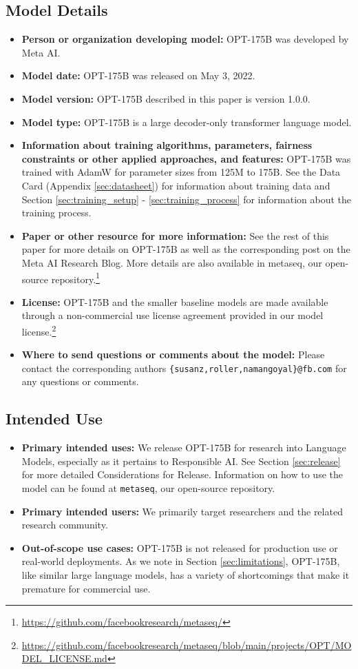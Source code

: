 \documentclass[11pt]{article}
\newcommand{\OPT}[0]{{OPT-175B}}
\begin{document}
\subsection{Model Details}
\begin{itemize}
    \item \textbf{Person or organization developing model:} \OPT{} was developed by Meta AI.
    \item \textbf{Model date:} \OPT{} was released on May 3, 2022.
    \item \textbf{Model version:} \OPT{} described in this paper is version 1.0.0.
    \item \textbf{Model type:} \OPT{} is a large decoder-only transformer language model.
    \item \textbf{Information about training algorithms, parameters, fairness constraints or other applied approaches, and features:} \OPT{} was trained with AdamW for parameter sizes from 125M to 175B. See the Data Card (Appendix \ref{sec:datasheet}) for information about training data and Section \ref{sec:training_setup} - \ref{sec:training_process} for information about the training process. 
    \item \textbf{Paper or other resource for more information:} See the rest of this paper for more details on \OPT{} as well as the corresponding post on the Meta AI Research Blog. More details are also available in metaseq, our open-source repository.\footnote{\url{https://github.com/facebookresearch/metaseq/}}
    \item \textbf{License:} \OPT{} and the smaller baseline models are made available through a non-commercial use license agreement provided in our model license.\footnote{\url{https://github.com/facebookresearch/metaseq/blob/main/projects/OPT/MODEL_LICENSE.md}}
    \item \textbf{Where to send questions or comments about the model:} Please contact the corresponding authors \texttt{\{susanz,roller,namangoyal\}@fb.com} for any questions or comments.
\end{itemize}

\subsection{Intended Use}
\begin{itemize}
    \item \textbf{Primary intended uses:} We release \OPT{} for research into Language Models, especially as it pertains to Responsible AI. See Section \ref{sec:release} for more detailed Considerations for Release. Information on how to use the model can be found at \texttt{metaseq}, our open-source repository.
    \item \textbf{Primary intended users:} We primarily target researchers and the related research community.
    \item \textbf{Out-of-scope use cases: } \OPT{} is not released for production use or real-world deployments. As we note in Section \ref{sec:limitations}, \OPT{}, like similar large language models, has a variety of shortcomings that make it premature for commercial use.
\end{itemize}
 
\end{document}
